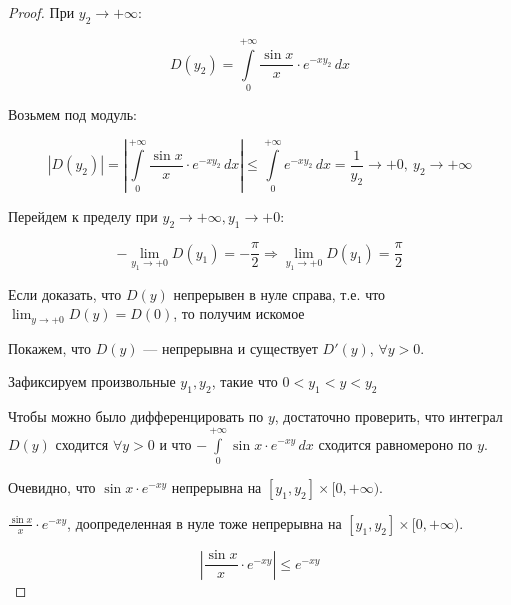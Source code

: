 \begin{proof}
\noindent При $y_2 \to +\infty$:

\[
D(y_2) = \int\limits_0^{+\infty} \frac{\sin x}{x} \cdot e^{-x y_2} \, dx
\]

Возьмем под модуль:

\[
\left| D(y_2) \right|
= \left| \int\limits_0^{+\infty} \frac{\sin x}{x} \cdot e^{-x y_2} \, dx \right|
\leq \int\limits_0^{+\infty} e^{-x y_2} \, dx
= \frac{1}{y_2} \longrightarrow +0, \  y_2 \to +\infty
\]



\noindent Перейдем к пределу при $y_2 \rightarrow + \infty,  y_1 \rightarrow +0$:

\[
- \lim_{y_1 \to +0} D(y_1) = -\frac{\pi}{2} \Rightarrow \lim_{y_1 \to +0} D(y_1) = \frac{\pi}{2}
\]

\begin{note}
Если доказать, что $D(y)$ непрерывен в нуле справа, т.е. что $\lim_{y \to +0} D(y) = D(0)$, то получим искомое
\end{note}

\noindent Покажем, что \( D(y) \) — непрерывна и существует \( D'(y) \), \( \forall y > 0 \).

\noindent Зафиксируем произвольные \( y_1, y_2 \), такие что \( 0 < y_1 < y < y_2 \)

\begin{center}
\end{center}


\begin{note}
Чтобы можно было дифференцировать по $y$, достаточно проверить, что интеграл $D(y)$ сходится $\forall y > 0$ и что $- \int\limits_0^{+\infty} \sin x \cdot e^{-x y} \, dx$ сходится равномероно по $y$.
\end{note}

\noindent Очевидно, что $ \sin x \cdot e^{-x y}$ непрерывна на $[y_1, y_2] \times [0, +\infty)$.

\noindent $\frac{\sin{x}}{x}\cdot e^{-x y}$, доопределенная в нуле тоже непрерывна на $[y_1, y_2] \times [0, +\infty)$.


\[
\left| \frac{\sin x}{x} \cdot e^{-x y} \right| \leq e^{-x y}
\]


\end{proof}

